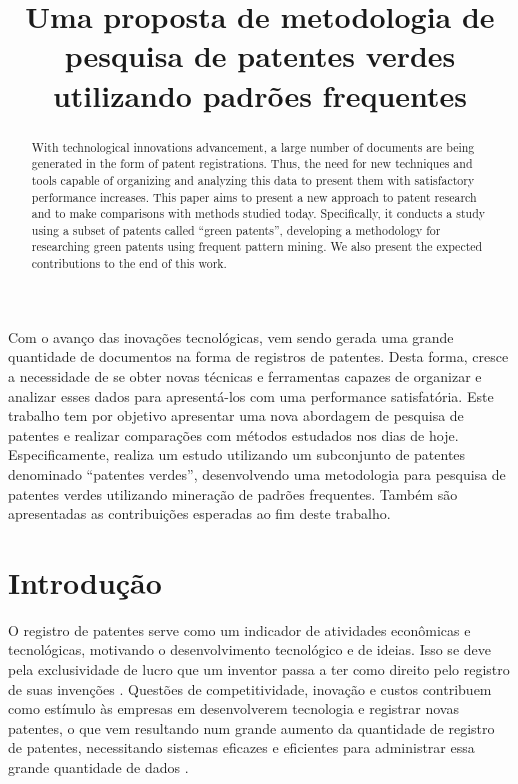 \documentclass[12pt]{article}
\title{Uma proposta de metodologia de pesquisa de patentes verdes utilizando padrões frequentes}
\author{}
\begin{document}
\maketitle


\begin{abstract}
With technological innovations advancement, a large number of documents are being generated in the form of patent registrations. Thus, the need for new techniques and tools capable of organizing and analyzing this data to present them with satisfactory performance increases. This paper aims to present a new approach to patent research and to make comparisons with methods studied today. Specifically, it conducts a study using a subset of patents called ``green patents'', developing a methodology for researching green patents using frequent pattern mining. We also present the expected contributions to the end of this work.

\end{abstract}


\begin{resumo} 

Com o avanço das inovações tecnológicas, vem sendo gerada uma grande quantidade de documentos na forma de registros de patentes. Desta forma, cresce a necessidade de se obter novas técnicas e ferramentas capazes de organizar e analizar esses dados para apresentá-los com uma performance satisfatória. Este trabalho tem por objetivo apresentar uma nova abordagem de pesquisa de patentes e realizar comparações com métodos estudados nos dias de hoje. Especificamente, realiza um estudo utilizando um subconjunto de patentes denominado ``patentes verdes'', desenvolvendo uma metodologia para pesquisa de patentes verdes utilizando mineração de padrões frequentes. Também são apresentadas as contribuições esperadas ao fim deste trabalho. 

\end{resumo}

\section{Introdução}
\label{sec:intro}

O registro de patentes serve como um indicador de atividades econômicas e tecnológicas, motivando o desenvolvimento tecnológico e de ideias. Isso se deve pela exclusividade de lucro que um inventor passa a ter como direito pelo registro de suas invenções \citep{ernst2003patent, almeida1997exploration}. Questões de competitividade, inovação e custos contribuem como estímulo às empresas em desenvolverem tecnologia e registrar novas patentes, o que vem resultando num grande aumento da quantidade de registro de patentes, necessitando sistemas eficazes e eficientes para administrar essa grande quantidade de dados \citep{shalaby2017patent}. 
\end{document}
